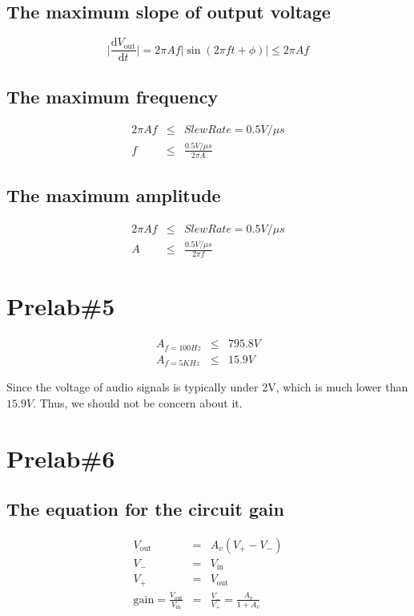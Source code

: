 \documentclass{IEEEtran}
\begin{document}
	\subsection{The maximum slope of output voltage}
	\begin{equation*}
		\bigg|\frac{\mathrm{d}V_{\mathrm{out}}}{\mathrm{d}t}\bigg| = 2\pi Af|\sin(2\pi ft+\phi)| \le 2\pi Af
	\end{equation*}
	\subsection{The maximum frequency}
	\begin{eqnarray*}
		2\pi Af & \le & SlewRate = 0.5\si{V/\mu s} \\
		f & \le & \frac{0.5\si{V/\mu s}}{2\pi A}
	\end{eqnarray*}
	\subsection{The maximum amplitude}
	\begin{eqnarray*}
		2\pi Af & \le & SlewRate = 0.5\si{V/\mu s} \\
		A & \le & \frac{0.5\si{V/\mu s}}{2\pi f}
	\end{eqnarray*}
	
	\section{\textbf{Prelab\#5}}
	\begin{eqnarray*}
		A_{f=100\si{Hz}} & \le & 795.8\si{V} \\
		A_{f=5\si{KHz}} & \le & 15.9\si{V}
	\end{eqnarray*}
		
	Since the voltage of audio signals is typically under 2V, which is much lower than $15.9\si{V}$. Thus, we should not be concern about it.
	
	\section{\textbf{Prelab\#6}}
	\subsection{The equation for the circuit gain}
	\begin{eqnarray*}
		V_{\mathrm{out}} & = & A_v(V_+-V_-) \\
		V_- & = & V_{\mathrm{in}} \\
		V_+ & = & V_{\mathrm{out}} \\
		\mathrm{gain} = \frac{V_{\mathrm{out}}}{V_{\mathrm{in}}} & = & \frac{V_-}{V_+} = \frac{A_v}{1 + A_v}
	\end{eqnarray*}
\end{document}
